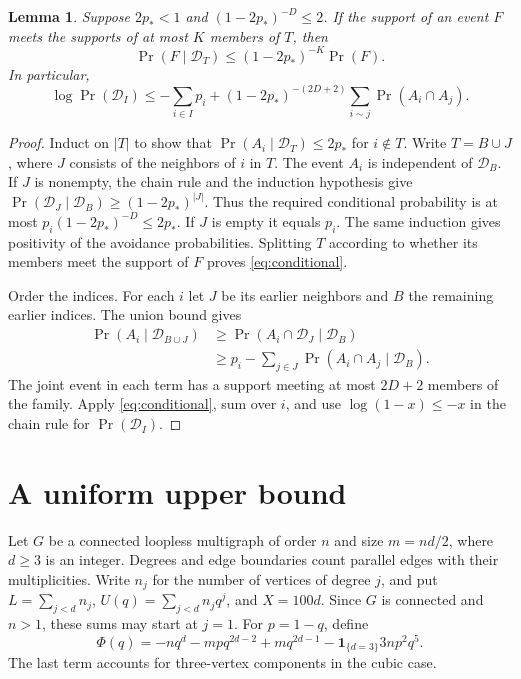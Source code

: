\documentclass[11pt,reqno]{amsart}
\newtheorem{lemma}[theorem]{Lemma}
\theoremstyle{remark}
\numberwithin{equation}{section}
\newcommand{\ind}{\mathbf{1}}
\newcommand{\avo}{\mathcal D}
\begin{document}
\begin{lemma}\label{lem:void}
Suppose $2p_*<1$ and $(1-2p_*)^{-D}\le2$. If the support of an event $F$ meets the supports of at most $K$ members of $T$, then
\begin{equation}\label{eq:conditional}
 \Pr(F\mid\avo_T)\le (1-2p_*)^{-K}\Pr(F).
\end{equation}
In particular,
\begin{equation}\label{eq:void}
 \log\Pr(\avo_I)\le-\sum_{i\in I}p_i+
 (1-2p_*)^{-(2D+2)}\sum_{i\sim j}\Pr(A_i\cap A_j).
\end{equation}
\end{lemma}
\begin{proof}
Induct on $|T|$ to show that $\Pr(A_i\mid\avo_T)\le 2p_*$ for $i\notin T$. Write $T=B\cup J$, where $J$ consists of the neighbors of $i$ in $T$. The event $A_i$ is independent of $\avo_B$. If $J$ is nonempty, the chain rule and the induction hypothesis give $\Pr(\avo_J\mid\avo_B)\ge(1-2p_*)^{|J|}$. Thus the required conditional probability is at most $p_i(1-2p_*)^{-D}\le2p_*$. If $J$ is empty it equals $p_i$. The same induction gives positivity of the avoidance probabilities. Splitting $T$ according to whether its members meet the support of $F$ proves \eqref{eq:conditional}.

Order the indices. For each $i$ let $J$ be its earlier neighbors and $B$ the remaining earlier indices. The union bound gives
\begin{align*}
 \Pr(A_i\mid\avo_{B\cup J})
 &\ge \Pr(A_i\cap\avo_J\mid\avo_B)\\
 &\ge p_i-\sum_{j\in J}\Pr(A_i\cap A_j\mid\avo_B).
\end{align*}
The joint event in each term has a support meeting at most $2D+2$ members of the family. Apply \eqref{eq:conditional}, sum over $i$, and use $\log(1-x)\le-x$ in the chain rule for $\Pr(\avo_I)$.
\end{proof}

\section{A uniform upper bound}\label{sec:upper}

Let $G$ be a connected loopless multigraph of order $n$ and size
$m=nd/2$, where $d\ge3$ is an integer. Degrees and edge boundaries
count parallel edges with their multiplicities. Write $n_j$ for the
number of vertices of degree $j$, and put
$L=\sum_{j<d}n_j$, $U(q)=\sum_{j<d}n_jq^j$, and $X=100d$.
Since $G$ is connected and $n>1$, these sums may start at $j=1$.
For $p=1-q$, define
\begin{equation}\label{eq:phi}
 \Phi(q)=-nq^d-mp q^{2d-2}+m q^{2d-1}
          -\ind_{\{d=3\}}3np^2q^5.
\end{equation}
The last term accounts for three-vertex components in the cubic case.
\end{document}
